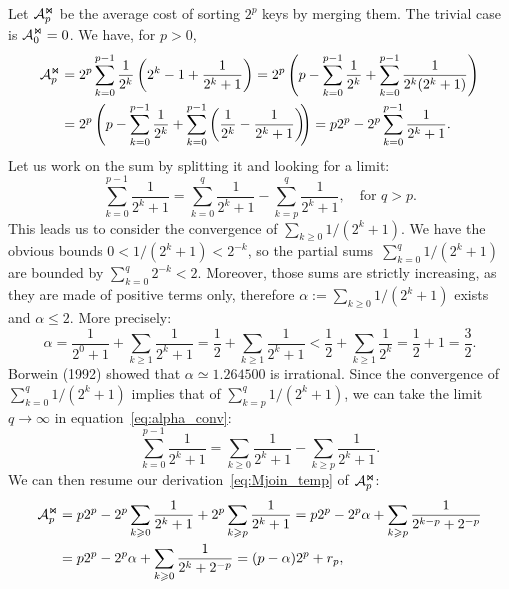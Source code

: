 \documentclass[a4paper,11pt,twoside,final]{book}
\theoremstyle{plain}
\begin{document}
Let \(\mathcal{A}_{p}^{\Join}\) be the average cost of sorting \(2^p\) keys by merging
them. The trivial case is \(\mathcal{A}_{0}^{\Join} = 0\). We have, for \(p > 0\),
\begin{align}
 \mathcal{A}_{p}^{\Join}
  &= 2^p\sum_{k=0}^{p-1}{\frac{1}{2^k}\left(2^k - 1 + \frac{1}{2^k +
      1}\right)}= 2^{p}\left(p - \sum_{k=0}^{p-1}{\frac{1}{2^k}}
     + \sum_{k=0}^{p-1}{\frac{1}{2^k(2^k+1)}}\right)\notag\\
  &= 2^{p}\left(p - \sum_{k=0}^{p-1}{\frac{1}{2^k}}
     + \sum_{k=0}^{p-1}\left(\frac{1}{2^k}
     - \frac{1}{2^k+1}\right)\!\!\right)
     = p2^p - 2^p \sum_{k=0}^{p-1}\frac{1}{2^k+1}.
     \label{eq:Mjoin_temp}
\end{align}
Let us work on the sum by splitting it and looking for a limit:
\begin{equation}
  \sum_{k=0}^{p-1}\frac{1}{2^k+1} = \sum_{k=0}^q\frac{1}{2^k+1} -
  \sum_{k=p}^q\frac{1}{2^k+1}, \quad \text{for \(q > p\)}.
  \label{eq:alpha_conv}
\end{equation}
This leads us to consider the convergence of \(\sum_{k \geqslant
  0}1/(2^k+1)\). We have the obvious bounds \(0 < 1/(2^k+1) < 2^{-k}\), so the
partial sums~\(\sum_{k=0}^q{1/(2^k+1)}\) are bounded by \(\sum_{k=0}^{q}2^{-k} <
2\). Moreover, those sums are strictly increasing, as they are made of positive
terms only, therefore \(\alpha := \sum_{k \geqslant 0}1/(2^k+1)\) exists and
\(\alpha \leqslant 2\). More precisely:
\begin{equation*}
  \alpha
  = \frac{1}{2^0+1} + \sum_{k \geqslant 1}\frac{1}{2^k+1}
  = \frac{1}{2} + \sum_{k \geqslant 1}\frac{1}{2^k+1}
  < \frac{1}{2} + \sum_{k \geqslant 1}\frac{1}{2^k}
  = \frac{1}{2} + 1 = \frac{3}{2}.
\end{equation*}
Borwein (1992) showed that \(\alpha \simeq 1.264500\) is irrational. Since the
convergence of \(\sum_{k=0}^q{1/(2^k+1)}\) implies that of
\(\sum_{k=p}^q{1/(2^k+1)}\), we can take the limit \(q \rightarrow \infty\) in
equation~\eqref{eq:alpha_conv}:
\begin{equation*}
  \sum_{k=0}^{p-1}\frac{1}{2^k+1} = \sum_{k \geqslant 0}\frac{1}{2^k+1} -
  \sum_{k \geqslant p}\frac{1}{2^k+1}.
\end{equation*}
We can then resume our derivation~\eqref{eq:Mjoin_temp} of \(\mathcal{A}_{p}^{\Join}\):
\begin{align}
 \mathcal{A}_{p}^{\Join}
  &= p2^p - 2^p \sum_{k \geqslant 0}\frac{1}{2^k+1}
   + 2^p \sum_{k \geqslant p}\frac{1}{2^k+1}= p2^p - 2^p \alpha + \sum_{k \geqslant p}\frac{1}{2^{k-p}+2^{-p}}\notag\\
  &= p2^p - 2^p \alpha + \sum_{k \geqslant 0}\frac{1}{2^k+2^{-p}}
   = (p - \alpha) 2^p + r_p,
\label{eq:Mjoin}
\end{align}
\end{document}

